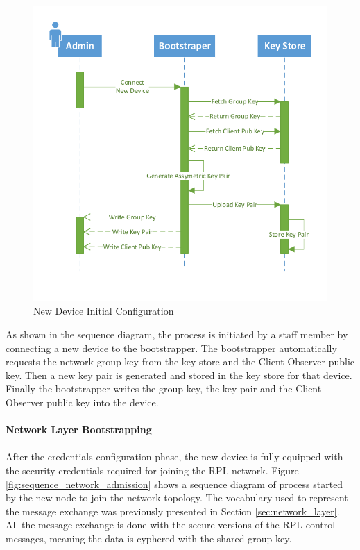 \begin{figure}[h]
  \centering
  \includegraphics[width=0.8\linewidth]{figures/Sequence_Bootstrapping.pdf}
  \caption{New Device Initial Configuration}
  \label{fig:sequence_bootstrapping}
\end{figure}

As shown in the sequence diagram, the process is initiated by a staff member by connecting a new device to the bootstrapper. The bootstrapper automatically requests the network group key from the key store and the Client Observer public key. Then a new key pair is generated and stored in the key store for that device. Finally the bootstrapper writes the group key, the key pair and the Client Observer public key into the device.
\pagebreak
\paragraph{\textbf{Network Layer Bootstrapping}}
\paragraph{}

After the credentials configuration phase, the new device is fully equipped with the security credentials required for joining the RPL network. Figure \ref{fig:sequence_network_admission} shows a sequence diagram of process started by the new node to join the network topology. The vocabulary used to represent the message exchange was previously presented in Section \ref{sec:network_layer}. All the message exchange is done with the secure versions of the RPL control messages, meaning the data is cyphered with the shared group key.

